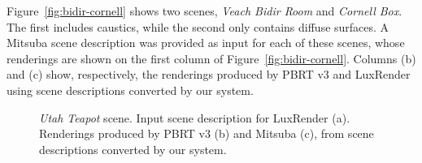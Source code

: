 Figure~\ref{fig:bidir-cornell} shows two scenes, \textit{Veach Bidir Room} and \textit{Cornell Box}. The first includes caustics, while the second only contains diffuse surfaces. A Mitsuba scene description was provided as input for each of these scenes, whose renderings are shown on the first column of Figure~\ref{fig:bidir-cornell}. Columns (b) and (c) show, respectively, the renderings produced by PBRT v3 and LuxRender using scene descriptions converted by our system.    



\begin{figure}
\centering

%
\caption{\textit{Utah Teapot} scene. Input scene description for LuxRender (a).	Renderings produced by PBRT v3 (b) and Mitsuba (c),
	from scene descriptions converted by our system.}
\label{fig:teapot}
\end{figure}

